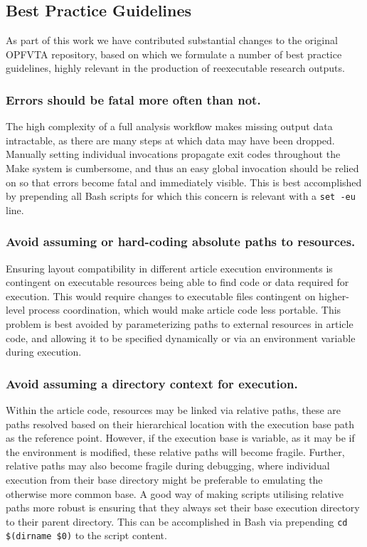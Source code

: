 \subsection{Best Practice Guidelines}

As part of this work we have contributed substantial changes to the original OPFVTA repository, based on which we formulate a number of best practice guidelines, highly relevant in the production of reexecutable research outputs.

\subsubsection{Errors should be fatal more often than not.}
The high complexity of a full analysis workflow makes missing output data intractable, as there are many steps at which data may have been dropped.
Manually setting individual invocations propagate exit codes throughout the Make system is cumbersome, and thus an easy global invocation should be relied on so that errors become fatal and immediately visible.
This is best accomplished by prepending all Bash scripts for which this concern is relevant with a \texttt{set -eu} line.

\subsubsection{Avoid assuming or hard-coding absolute paths to resources.}
Ensuring layout compatibility in different article execution environments is contingent on executable resources being able to find code or data required for execution.
This would require changes to executable files contingent on higher-level process coordination, which would make article code less portable.
This problem is best avoided by parameterizing paths to external resources in article code, and allowing it to be specified dynamically or via an environment variable during execution.

\subsubsection{Avoid assuming a directory context for execution.}
Within the article code, resources may be linked via relative paths, these are paths resolved based on their hierarchical location with the execution base path as the reference point.
However, if the execution base is variable, as it may be if the environment is modified, these relative paths will become fragile.
Further, relative paths may also become fragile during debugging, where individual execution from their base directory might be preferable to emulating the otherwise more common base.
A good way of making scripts utilising relative paths more robust is ensuring that they always set their base execution directory to their parent directory.
This can be accomplished in Bash via prepending \texttt{cd \textquotedbl\$(dirname \textquotedbl\$0\textquotedbl)\textquotedbl} to the script content.

